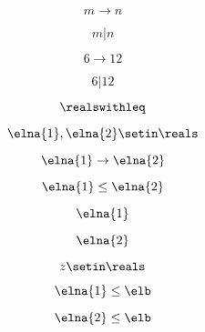 {\begin{forslides}
    \begin{equation}
        \label{eq:feedback-126}
        m\to n
    \end{equation}

    \begin{equation}
        \label{eq:feedback-127}
        m | n
    \end{equation}

    \begin{equation}
        \label{eq:feedback-128}
        6\to 12
    \end{equation}

    \begin{equation}
        \label{eq:feedback-129}
        6 | 12
    \end{equation}

    \begin{equation}
        \label{eq:feedback-130}
        \realswithleq
    \end{equation}

    \begin{equation}
        \label{eq:feedback-131}
        \elna{1},\elna{2}\setin \reals
    \end{equation}

    \begin{equation}
        \label{eq:feedback-132}
        \elna{1}\to \elna{2}
    \end{equation}

    \begin{equation}
        \label{eq:feedback-133}
        \elna{1}\leq \elna{2}
    \end{equation}

    \begin{equation}
        \label{eq:feedback-134}
        \elna{1}
    \end{equation}

    \begin{equation}
        \label{eq:feedback-135}
        \elna{2}
    \end{equation}

    \begin{equation}
        \label{eq:feedback-136}
        z\setin \reals
    \end{equation}

    \begin{equation}
        \label{eq:feedback-137}
        \elna{1}\leq \elb
    \end{equation}

    \begin{equation}
        \label{eq:feedback-138}
        \elna{2}\leq \elb
    \end{equation}


\end{forslides}}
